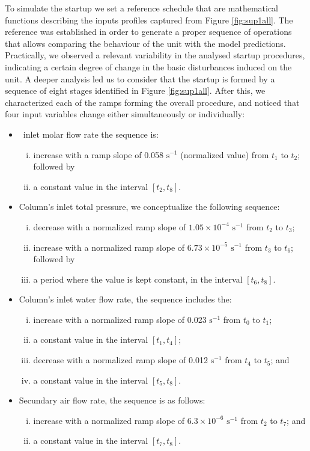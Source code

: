 \documentclass[journal=jacsat,manuscript=article]{achemso}
\newcommand{\nox}{\ce{NO_{\rmfamily{x}}}}
\begin{document}
To simulate the startup we set a reference schedule that are mathematical functions describing the inputs profiles captured from Figure \ref{fig:sup1all}.
The reference was established in order to generate a proper sequence of operations that allows comparing the behaviour of the unit with the model predictions. Practically, we observed a relevant variability in the analysed startup procedures, indicating a certain degree of change in the basic disturbances induced on the unit. A deeper analysis led us to consider that the startup is formed by a sequence of eight stages identified in Figure  \ref{fig:sup1all}. After this, we characterized each of the ramps forming the overall procedure, and noticed that four input variables change either simultaneously or individually:
\begin{itemize}
	\item \nox~inlet molar flow rate the sequence is: 
	\begin{enumerate}[(i)]
		\item increase with a ramp slope of 0.058 $\text{s}^{-1}$ (normalized value) from $t_1$ to $t_2$; followed by
		\item a constant value in the interval $[t_2,t_8]$.
	\end{enumerate}
	\item Column's inlet total pressure, we conceptualize the following sequence:
	\begin{enumerate}[(i)]
		\item decrease with a normalized ramp slope of $1.05 \times 10^{-4}$ $\text{s}^{-1}$ from $t_2$ to $t_3$;
		\item increase with a normalized ramp slope of $6.73 \times 10^{-5}$ $\text{s}^{-1}$ from $t_3$ to $t_6$; followed by 
		\item a period where the value is kept constant, in the interval $[t_6,t_8]$.
	\end{enumerate}
	\item Column's inlet water flow rate, the sequence includes the: 
	\begin{enumerate}[(i)]
		\item increase with a normalized ramp slope of 0.023 $\text{s}^{-1}$ from $t_0$ to $t_1$;
		\item a constant value in the interval $[t_1,t_4]$;
		\item decrease with a normalized ramp slope of 0.012 $\text{s}^{-1}$ from $t_4$ to $t_5$; and 
		\item a constant value in the interval $[t_5,t_8]$.
	\end{enumerate}
	\item Secundary air flow rate, the sequence is as follows:
	\begin{enumerate}[(i)]
		\item increase with a normalized ramp slope of $6.3 \times 10^{-6}$ $\text{s}^{-1}$ from $t_2$ to $t_7$; and 
		\item a constant value in the interval $[t_7,t_8]$.
	\end{enumerate}
\end{itemize}
\end{document}
